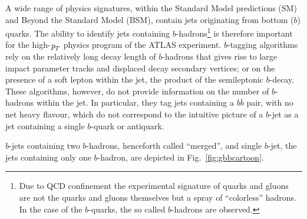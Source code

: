 A wide range of physics signatures, within the Standard Model predictions (SM) and Beyond the Standard Model (BSM), contain jets originating from bottom ($b$) quarks. 
The ability to identify jets containing $b$-hadrons\footnote{Due to QCD confinement the experimental signature of quarks and gluons are not the quarks and gluons themselves but a spray of ``colorless'' hadrons. In the case of the $b$-quarks, the so called $b$-hadrons are observed.} is therefore important for the high-${\emph{p}_{T}}$ physics program of the ATLAS experiment. $b$-tagging algorithms rely on the relatively long decay length of $b$-hadrons that gives rise to large impact parameter tracks and displaced decay secondary vertices; or on the presence of a soft lepton within the jet, the product of the semileptonic $b$-decay.   
These algorithms, however, do not provide information on the number of $b$-hadrons within the jet. In particular, they tag jets containing a $b\bar{b}$ pair, with no net heavy flavour, which do not correspond to the intuitive picture of a
$b$-jet as a jet containing a single $b$-quark or antiquark.

 $b$-jets containing two $b$-hadrons, henceforth called ``merged'',  and single $b$-jet, the jets containing only one $b$-hadron, are depicted in Fig.~\ref{fig:gbbcartoon}. 

